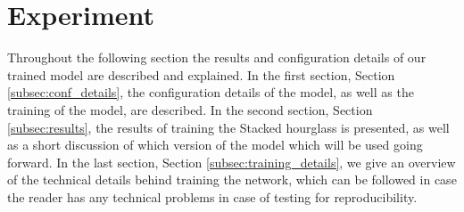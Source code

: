 \documentclass[./main.tex]{subfiles}
\begin{document}
\section{Experiment}\label{experiement}
Throughout the following section the results and configuration details of our trained model are described and explained. In the first section, Section \ref{subsec:conf_details}, the configuration details of the model, as well as the training of the model, are described. In the second section, Section \ref{subsec:results}, the results of training the Stacked hourglass is presented, as well as a short discussion of which version of the model which will be used going forward. In the last section, Section \ref{subsec:training_details}, we give an overview of the technical details behind training the network, which can be followed in case the reader has any technical problems in case of testing for reproducibility.
\end{document}
